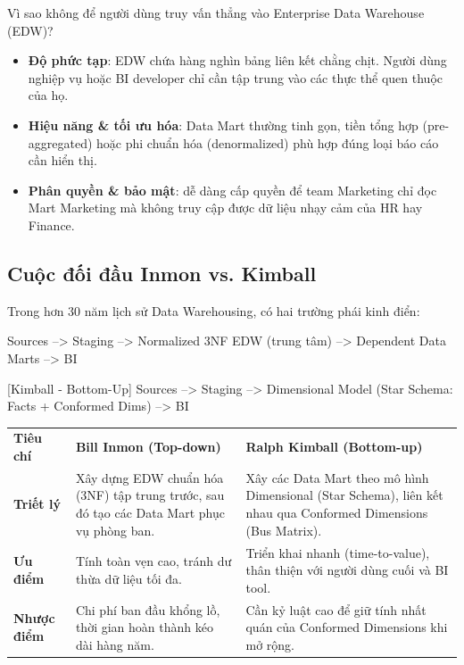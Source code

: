 \documentclass[12pt]{article}
\begin{document}
Vì sao không để người dùng truy vấn thẳng vào Enterprise Data Warehouse (EDW)?
\begin{itemize}
    \item \textbf{Độ phức tạp}: EDW chứa hàng nghìn bảng liên kết chằng chịt. Người dùng nghiệp vụ hoặc BI developer chỉ cần tập trung vào các thực thể quen thuộc của họ.
    \item \textbf{Hiệu năng \& tối ưu hóa}: Data Mart thường tinh gọn, tiền tổng hợp (pre-aggregated) hoặc phi chuẩn hóa (denormalized) phù hợp đúng loại báo cáo cần hiển thị.
    \item \textbf{Phân quyền \& bảo mật}: dễ dàng cấp quyền để team Marketing chỉ đọc Mart Marketing mà không truy cập được dữ liệu nhạy cảm của HR hay Finance.
\end{itemize}

\subsection{Cuộc đối đầu Inmon vs. Kimball}

Trong hơn 30 năm lịch sử Data Warehousing, có hai trường phái kinh điển:

\begin{aivnplainbox}
Sources --> Staging --> Normalized 3NF EDW (trung tâm) --> Dependent Data Marts --> BI

[Kimball - Bottom-Up]
Sources --> Staging --> Dimensional Model (Star Schema: Facts + Conformed Dims) --> BI
\end{aivnplainbox}

\noindent
\begin{longtable}{@{}>{\RaggedRight\arraybackslash}p{2.4cm}>{\RaggedRight\arraybackslash}p{6.7cm}>{\RaggedRight\arraybackslash}p{6.7cm}@{}}
\rowcolor{rowLavender}
\textbf{Tiêu chí} & \textbf{Bill Inmon (Top-down)} & \textbf{Ralph Kimball (Bottom-up)} \\
\addlinespace[3pt]
\endhead
\textbf{Triết lý} & Xây dựng EDW chuẩn hóa (3NF) tập trung trước, sau đó tạo các Data Mart phục vụ phòng ban. & Xây các Data Mart theo mô hình Dimensional (Star Schema), liên kết nhau qua Conformed Dimensions (Bus Matrix). \\
\addlinespace[3pt]
\textbf{Ưu điểm} & Tính toàn vẹn cao, tránh dư thừa dữ liệu tối đa. & Triển khai nhanh (time-to-value), thân thiện với người dùng cuối và BI tool. \\
\addlinespace[3pt]
\textbf{Nhược điểm} & Chi phí ban đầu khổng lồ, thời gian hoàn thành kéo dài hàng năm. & Cần kỷ luật cao để giữ tính nhất quán của Conformed Dimensions khi mở rộng. \\
\end{longtable}
\end{document}
